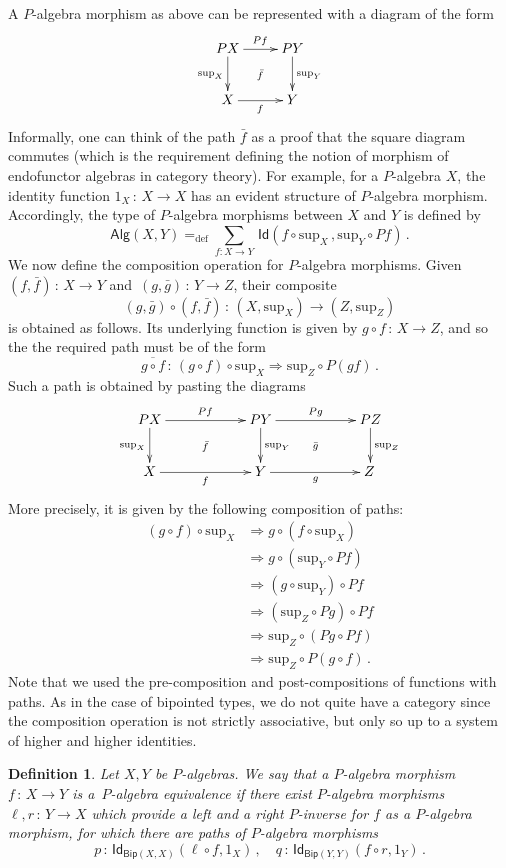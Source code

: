 \documentclass[10pt,a4paper,oneside,reqno]{amsart}
\theoremstyle{mythm}
\theoremstyle{mydef}
\newtheorem{definition}[theorem]{Definition}
\theoremstyle{myrmk}
\newcommand{\ie}{\text{i.e.\ }}
\newcommand{\defeq}{=_{\mathrm{def}}}
\newcommand{\co}{\,{:}\,}
\newcommand{\Id}{\mathsf{Id}}
\newcommand{\Bip}{\mathsf{Bip}}
\newcommand{\Palg}{\mathsf{Alg}}
\renewcommand{\sup}{\mathrm{sup}}
\begin{document}
A $P$-algebra morphism as above can be represented with a diagram of the form
\[
\xymatrix{
 PX \ar[d]_{\sup_X} \ar[r]^{Pf}  \ar@{}[dr]|{\bar{f}} &  PY \ar[d]^{\sup_Y}\\
X \ar[r]_{f}   & Y }
\] 
Informally, one can think of the path $\bar{f}$ as a proof that the square diagram commutes (which is the 
requirement defining the notion of morphism of endofunctor algebras in category theory). For example, for a $P$-algebra $X$, 
the identity function $1_X \co X \to X$ has an evident structure of $P$-algebra morphism. Accordingly, the type of $P$-algebra 
morphisms between $X$ and $Y$ is defined by
\[
\Palg(X,Y)
 \defeq  
\sum_{f:  X \rightarrow Y} \, \Id(f\circ \sup_X \, ,  \sup_Y \circ P f )  \, .
\]
We now define the composition operation for $P$-algebra morphisms. Given $(f, \bar{f}) \co X \to Y$ and~$(g, \bar{g}) \co Y \to Z$,
their composite 
\[
(g, \bar{g}) \circ (f, \bar{f}) \co (X, \sup_X) \to (Z, \sup_Z)
\] 
is obtained as follows. Its underlying function is given by $g\circ f\co X \to Z$, and so the 
the required path must be of the form
\[
 \overline{ g \circ f} \co (g\circ f) \circ \sup_X \Rightarrow \sup_Z \circ P(gf)\, .
\]
Such a path is obtained by pasting the diagrams 
\[
\xymatrix@C=2cm{
 PX \ar[d]_{\sup_X} \ar[r]^{Pf}  \ar@{}[dr]|{\bar{f}} &  PY \ar[d]^{\sup_Y}  \ar[r]^{Pg}  \ar@{}[dr]|{\bar{g}} &  PZ \ar[d]^{\sup_Z} \\
X \ar[r]_{f}   & Y \ar[r]_{g}   & Z \,  }
\]
More precisely, it is given by the following composition of paths:
\begin{align*}
(g\circ f) \circ \sup_X &  \Rightarrow g \circ (f \circ \sup_X) \\
 & \Rightarrow g \circ ( \sup_Y \circ P f ) \\
 & \Rightarrow (g \circ \sup_Y) \circ Pf \\
 & \Rightarrow (\sup_Z \circ Pg) \circ Pf \\
 & \Rightarrow \sup_Z \circ (Pg \circ Pf) \\
 & \Rightarrow \sup_Z \circ P (g\circ f) \, .
 \end{align*}
Note that we used the pre-composition and post-compositions of functions with paths. As in the case of bipointed types, we do not quite have a category since the composition operation is not strictly associative, but only so up to a system of higher and higher identities. 

\medskip



\begin{definition} Let $X, Y$ be $P$-algebras. We say that a $P$-algebra morphism $f \co X \to Y$ is 
 a~\emph{$P$-algebra equivalence}
if there exist $P$-algebra morphisms $\ell,r \co Y \to X$  which provide a left and a right $P$-inverse for $f$ as a
$P$-algebra morphism, \ie for
which there are paths of $P$-algebra morphisms
\[ 
p \co \Id_{\Bip(X,X)}( \ell \circ f,  1_X) \, , \quad q \co \Id_{\Bip(Y,Y)}( f \circ r , 1_Y) \, .
\]
\end{definition}
\end{document}
